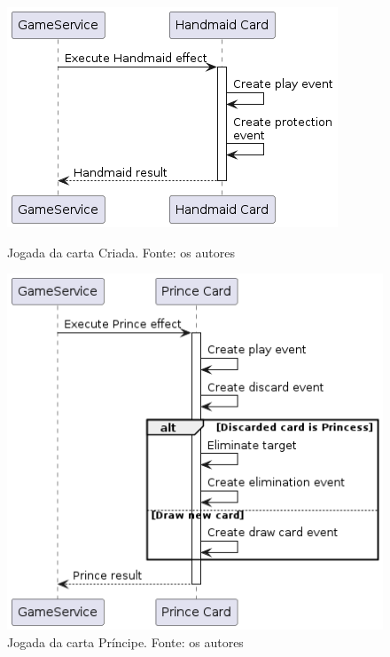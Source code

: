 \begin{figure}[h]
    \centering
    \begin{minipage}{0.48\textwidth}
        \centering
        \includegraphics[width=\textwidth]{diagrams/HandmaidCardPlay.png}
        \caption{Jogada da carta Criada. Fonte: os autores}
        \label{fig:handmaid-card-play}
    \end{minipage}
    \hfill
    \begin{minipage}{0.48\textwidth}
        \centering
        \includegraphics[width=\textwidth]{diagrams/PrinceCardPlay.png}
        \caption{Jogada da carta Príncipe. Fonte: os autores}
        \label{fig:prince-card-play}
    \end{minipage}
\end{figure}


